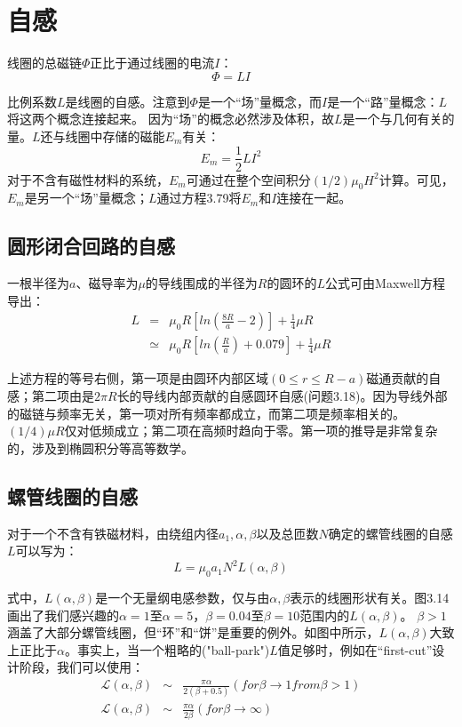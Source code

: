 \section{自感}
线圈的总磁链$\Phi$正比于通过线圈的电流$I$：
\begin{equation}
 \Phi=LI %
\end{equation}

比例系数$L$是线圈的自感。注意到$\Phi$是一个“场”量概念，而$I$是一个“路”量概念：$L$将这两个概念连接起来。
因为“场”的概念必然涉及体积，故$L$是一个与几何有关的量。$L$还与线圈中存储的磁能$E_m$有关：
\begin{equation}
 E_m=\frac{1}{2}LI^2 %
\end{equation}
对于不含有磁性材料的系统，$E_m$可通过在整个空间积分$(1/2)\mu_0 H^2$计算。可见，$E_m$是另一个“场”量概念；$L$通过方程3.79将$E_m$和$I$连接在一起。

\subsection{圆形闭合回路的自感}
一根半径为$a$、磁导率为$\mu$的导线围成的半径为$R$的圆环的$L$公式可由Maxwell方程导出：
\begin{eqnarray}
L&=&\mu_0R[ln(\frac{8R}{a}-2)]+\frac{1}{4}\mu R \\
&\simeq & \mu_0R[ln(\frac{R}{a})+0.079]+\frac{1}{4}\mu R%
\end{eqnarray}

上述方程的等号右侧，第一项是由圆环内部区域$(0\le r \le R-a)$磁通贡献的自感；第二项由是$2\pi R$长的导线内部贡献的自感圆环自感(问题3.18)。因为导线外部的磁链与频率无关，第一项对所有频率都成立，而第二项是频率相关的。$(1/4)\mu R$仅对低频成立；第二项在高频时趋向于零。第一项的推导是非常复杂的，涉及到椭圆积分等高等数学。

\subsection{螺管线圈的自感}
对于一个不含有铁磁材料，由绕组内径$a_1,\alpha,\beta$以及总匝数$N$确定的螺管线圈的自感$L$可以写为：
\begin{equation}
L=\mu_0a_1N^2L(\alpha,\beta)%
\end{equation}

式中，$L(\alpha,\beta)$是一个无量纲电感参数，仅与由$\alpha,\beta$表示的线圈形状有关。图3.14画出了我们感兴趣的$\alpha=1$至$\alpha=5$，$\beta=0.04$至$\beta=10$范围内的$L(\alpha,\beta)$。
$\beta>1$涵盖了大部分螺管线圈，但“环”和“饼”是重要的例外。如图中所示，$L(\alpha,\beta)$大致上正比于$\alpha$。事实上，当一个粗略的("ball-park")$L$值足够时，例如在“first-cut”设计阶段，我们可以使用：
\begin{eqnarray}
\mathcal{L}(\alpha,\beta)&\sim&\frac{\pi\alpha}{2(\beta+0.5)} (for \beta\rightarrow 1 from \beta>1)\\ %
\mathcal{L}(\alpha,\beta)&\sim&\frac{\pi\alpha}{2\beta} (for \beta\rightarrow \infty)%
\end{eqnarray}


